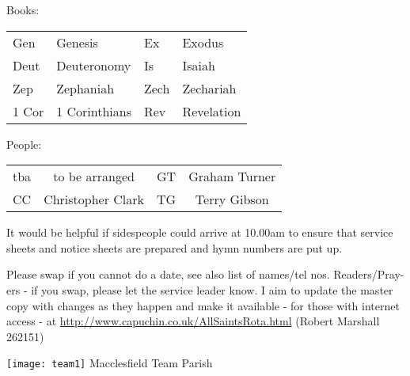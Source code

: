 \documentclass[10pt]{article}
\begin{document}
\begin{center}
\vspace{1em}
Books: \begin{tabular}{|l|l|l|l|} \hline
Gen & Genesis &
Ex & Exodus \\
Deut & Deuteronomy &
Is & Isaiah \\
Zep & Zephaniah &
Zech & Zechariah \\
1 Cor & 1 Corinthians &
Rev & Revelation 
  \\ \hline
\end{tabular}
People: \begin{tabular}{|c|c|c|c|}\hline
 tba & to be arranged & GT &  Graham Turner \\
 CC & Christopher Clark &   
TG & Terry Gibson \\
     \hline
  \end{tabular}
\end{center}
\begin{minipage}{0.7\textwidth}
It would be helpful if sidespeople 
could arrive at 10.00am to ensure that service sheets and notice sheets are 
prepared and hymn numbers are put up.

Please swap if you cannot do a date, see also list of names/tel nos.
Readers/Pray-ers - if you swap, please let the service leader know.
{\footnotesize I aim to update the master copy with changes as they
happen and make it available - for those with internet access - at
\url{http://www.capuchin.co.uk/AllSaintsRota.html} 
(Robert Marshall 262151)}
\end{minipage}
\begin{minipage}{0.3\textwidth}
\ifpdf
\else
\hspace{2em}
\texttt{[image: team1]} Macclesfield Team Parish
\fi
\end{minipage}
\end{document}
